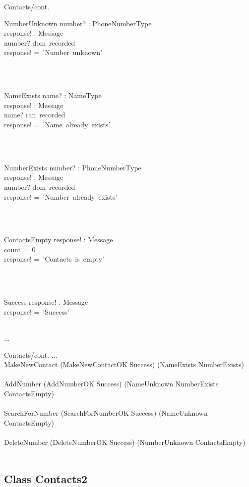 \documentclass[12pt]{article}
\begin{document}
\begin{spacing}{1.5}
\begin{class}{Contacts/cont.}
\begin{op}{NumberUnknown}
number? : PhoneNumberType\\
response! : Message\\
\ST
number? \notin dom~recorded\\
response! =~'Number~unknown'
\end{op}\\
\\
\begin{op}{NameExists}
name? : NameType\\
response! : Message\\
\ST
name? \in ran~recorded\\
response! =~'Name~already~exists'
\end{op}\\
\\
\begin{op}{NumberExists}
number? : PhoneNumberType\\
response! : Message\\
\ST
number? \in dom~recorded\\
response! =~'Number~already~exists'
\end{op}\\
\\
\begin{op}{ContactsEmpty}
response! : Message\\
\ST
count =~0\\
response! =~'Contacts~is~empty'
\end{op}\\
\\
\begin{op}{Success}
response! : Message\\
\ST
response! =~'Success'
\end{op}\\
...
\end{class}
\newpage
\begin{class}{Contacts/cont.}
...
\also
\mbox{}\\
MakeNewContact \sdef (MakeNewContactOK \land Success) \oplus (NameExists \lor NumberExists)  \\
\mbox{}\\
AddNumber \sdef (AddNumberOK \land Success) \oplus (NameUnknown \lor NumberExists \lor ContactsEmpty)  \\
\mbox{}\\
SearchForNumber \sdef (SearchForNumberOK \land Success) \oplus (NameUnknown \lor ContactsEmpty)  \\
\mbox{}\\
DeleteNumber \sdef (DeleteNumberOK \land Success) \oplus (NumberUnknown \lor ContactsEmpty)  \\
\mbox{}\\
\end{class}
\newpage
\subsection{Class Contacts2}


\end{spacing}
\end{document}
